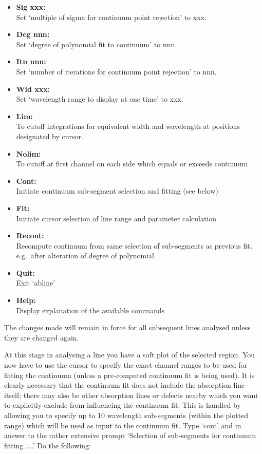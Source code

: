 \documentclass[11pt,twoside]{article}
\begin{document}
\begin{itemize}
\item{\bf Sig xxx:}\ \\
   Set `multiple of sigma for continuum point rejection' to xxx.
\item{\bf Deg nnn:}\ \\
   Set `degree of polynomial fit to continuum' to nnn.
\item{\bf Itn nnn:}\ \\
   Set `number of iterations for continuum point rejection' to nnn.
\item{\bf Wid xxx:}\ \\
   Set `wavelength range to display at one time' to xxx.
\item{\bf Lim:}\ \\
   To cutoff integrations for equivalent width and wavelength at
   positions designated by cursor.
\item{\bf Nolim:}\ \\
   To cutoff at first channel on each side which equals or exceeds
   continuum
\item{\bf Cont:}\ \\
   Initiate continuum sub-segment selection and fitting (see below)
\item{\bf Fit:}\ \\
   Initiate cursor selection of line range and parameter calculation
\item{\bf Recont:}\ \\
   Recompute continuum from same selection of sub-segments as previous
   fit; e.g.\ after alteration of degree of polynomial
\item{\bf Quit:}\ \\
   Exit `abline'
\item{\bf Help:}\ \\
   Display explanation of the available commands
\end{itemize}

   The changes made will remain in force for all subsequent lines
   analysed unless they are changed again.

   At this stage in analysing a line you have a soft plot of the
   selected region. You now have to use the cursor to specify the exact
   channel ranges to be used for fitting the continuum (unless a
   pre-computed continuum fit is being used). It is clearly necessary
   that the continuum fit does not include the absorption line itself;
   there may also be other absorption lines or defects nearby which you
   want to explicitly exclude from influencing the continuum fit. This
   is handled by allowing you to specify up to 10 wavelength sub-segments
   (within the plotted range) which will be used as input to the
   continuum fit. Type `cont' and in answer to the rather extensive
   prompt `Selection of sub-segments for continuum fitting ....' Do the
   following:
\end{document}
